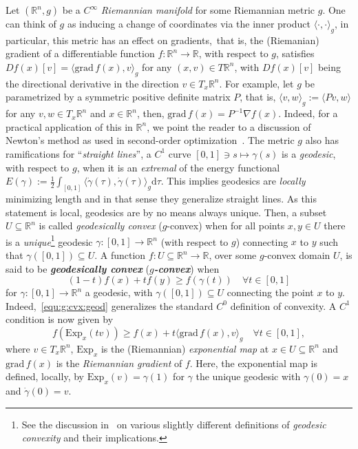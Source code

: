\documentclass[letterpaper, 10 pt, conference]{ieeeconf}  %
\theoremstyle{mystyle}
\begin{document}
Let $(\mathbb{R}^n,g)$ be a $C^{\infty}$ \textit{Riemannian manifold} for some Riemannian metric $g$. One can think of $g$ as inducing a change of coordinates via the inner product $\langle \cdot,\cdot \rangle_g$, in particular, this metric has an effect on gradients,~that is, the (Riemanian) gradient of a differentiable function $f:\mathbb{R}^n\to \mathbb{R}$, with respect to $g$, satisfies $Df(x)[v]=\langle \mathrm{grad}\,f(x), v\rangle_g$ for any $(x,v)\in T\mathbb{R}^n$, with $Df(x)[v]$ being the directional derivative in the direction $v\in T_x\mathbb{R}^n$. For example, let $g$ be parametrized by a symmetric positive definite matrix $P$, that is, $\langle v,w \rangle_g:=\langle Pv,w\rangle$ for any $v,w\in T_x\mathbb{R}^n$ and $x\in \mathbb{R}^n$, then, $\mathrm{grad}\,f(x) = P^{-1}\nabla f(x)$. Indeed, for a practical application of this in $\mathbb{R}^n$, we point the reader to a discussion of Newton's method as used in second-order optimization~\cite[Sec.~9.5]{ref:Boyd_04}. The metric $g$ also has ramifications for ``\textit{straight lines}'', a $C^1$ curve $[0,1]\ni s\mapsto \gamma(s)$ is a \textit{geodesic}, with respect to $g$, when it is an \textit{extremal} of the energy functional $E(\gamma):=\tfrac{1}{2}\int_{[0,1]} \langle \dot{\gamma}(\tau),\dot{\gamma}(\tau)\rangle_g \mathrm{d}\tau$. This implies geodesics are \textit{locally} minimizing length and in that sense they generalize straight lines. As this statement is local, geodesics are by no means always unique. Then, a subset $U\subseteq \mathbb{R}^n$ is called \textit{geodesically convex} ($g$-convex) when for all points $x,y\in U$ there is a \textit{unique}\footnote{See the discussion in~\cite[Sec.~11.3]{ref:boumal2020introduction} on various slightly different definitions of \textit{geodesic convexity} and their implications.} geodesic $\gamma:[0,1]\to \mathbb{R}^n$ (with respect to $g$) connecting $x$ to $y$ such that $\gamma([0,1])\subseteq U$. A function $f:U\subseteq \mathbb{R}^n\to \mathbb{R}$, over some $g$-convex domain $U$, is said to be \textbf{\textit{geodesically convex}} (\textbf{\textit{$g$-convex}}) when
\begin{equation}
    \label{equ:g:cvx:geod}
     (1-t)f(x)+tf(y)\geq f(\gamma(t))\quad \forall t\in [0,1]
\end{equation}
for $\gamma:[0,1]\to \mathbb{R}^n$ a geodesic, with $\gamma([0,1])\subseteq U$ connecting the point $x$ to $y$. Indeed,~\eqref{equ:g:cvx:geod} generalizes the standard $C^0$ definition of convexity. A $C^1$ condition is now given by
\begin{equation*}
    f(\mathrm{Exp}_x(tv))\geq f(x) + t\langle \mathrm{grad}\,f(x),v\rangle_g\quad \forall t\in [0,1],
\end{equation*}
where $v\in T_x\mathbb{R}^n$, $\mathrm{Exp}_x$ is the (Riemannian) \textit{exponential map} at $x\in U\subseteq \mathbb{R}^n$ and $\mathrm{grad}\,f(x)$ is the \textit{Riemannian gradient} of $f$. Here, the exponential map is defined, locally, by $\mathrm{Exp}_x(v)=\gamma(1)$ for $\gamma$ the unique geodesic with $\gamma(0)=x$ and $\dot{\gamma}(0)=v$.
\end{document}
